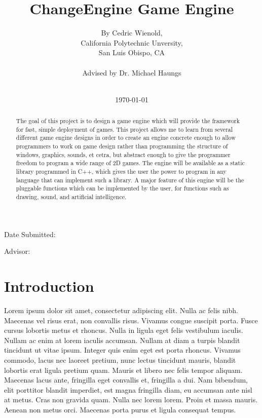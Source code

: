 \documentclass[12pt]{article}
\title{ChangeEngine Game Engine}
\author{By Cedric Wienold,\\
California Polytechnic Unversity,\\
San Luis Obispo, CA\\\\
Advised by Dr. Michael Haungs\\\\}
\date{\today}
\begin{document}
  
  \maketitle

  \thispagestyle{empty}

  \vfill

  \begin{flushright}
    
    Date Submitted:\makebox[1.5in]{\hrulefill}

    \vspace{12pt}
    
    Advisor:\makebox[1.5in]{\hrulefill}
  \end{flushright}

  \newpage
  

  \tableofcontents

  \newpage

  \begin{abstract}
    The goal of this project is to design a game engine which will provide the framework for fast, simple deployment of games. This project allows me to learn from several different game engine designs in order to create an engine concrete enough to allow programmers to work on game design rather than programming the structure of windows, graphics, sounds, et cetra, but abstract enough to give the programmer freedom to program a wide range of 2D games. The engine will be available as a static library programmed in C++, which gives the user the power to program in any language that can implement such a library. A major feature of this engine will be the pluggable functions which can be implemented by the user, for functions such as drawing, sound, and artificial intelligence.
  \end{abstract}
  
  \newpage
  

  \section{Introduction}
    Lorem ipsum dolor sit amet, consectetur adipiscing elit. Nulla ac felis nibh. Maecenas vel risus erat, non convallis risus. Vivamus congue suscipit porta. Fusce cursus lobortis metus et rhoncus. Nulla in ligula eget felis vestibulum iaculis. Nullam ac enim at lorem iaculis accumsan. Nullam at diam a turpis blandit tincidunt ut vitae ipsum. Integer quis enim eget est porta rhoncus. Vivamus commodo, lacus nec laoreet pretium, nunc lectus tincidunt mauris, blandit lobortis erat ligula pretium quam. Mauris et libero nec felis tempor aliquam. Maecenas lacus ante, fringilla eget convallis et, fringilla a dui. Nam bibendum, elit porttitor blandit imperdiet, est magna fringilla diam, eu accumsan ante nisl at metus. Cras non gravida quam. Nulla nec lorem lorem. Proin et massa mauris. Aenean non metus orci. Maecenas porta purus et ligula consequat tempus.
\end{document}
